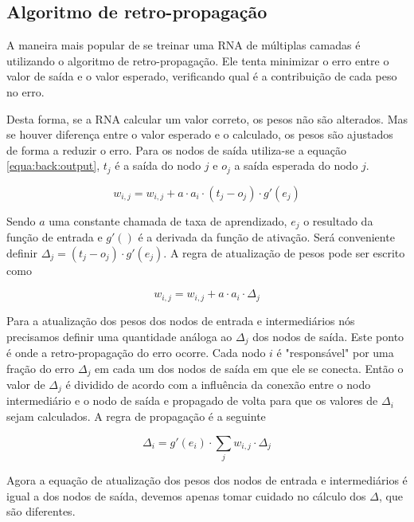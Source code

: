 \subsection{Algoritmo de retro-propagação}

A maneira mais popular de se treinar uma RNA de múltiplas camadas é utilizando o algoritmo de retro-propagação. Ele tenta minimizar o erro entre o valor de saída e o valor esperado, verificando qual é a contribuição de cada peso no erro.

Desta forma, se a RNA calcular um valor correto, os pesos não são alterados. Mas se houver diferença entre o valor esperado e o calculado, os pesos são ajustados de forma a reduzir o erro. Para os nodos de saída utiliza-se a equação \ref{equa:back:output}, $t_j$ é a saída do nodo $j$ e $o_j$ a saída esperada do nodo $j$.

\begin{equation}
	w_{i,j} = w_{i,j} + a \cdot a_i \cdot (t_j - o_j) \cdot g'(e_j)
	\label{equa:back:output}
\end{equation}

Sendo $a$ uma constante chamada de taxa de aprendizado, $e_j$ o resultado da função de entrada e $g'()$ é a derivada da função de ativação. Será conveniente definir $\Delta_j = (t_j - o_j) \cdot g'(e_j)$. A regra de atualização de pesos pode ser escrito como

\begin{equation}
	w_{i,j} = w_{i,j} + a \cdot a_i \cdot \Delta_j
\end{equation}

Para a atualização dos pesos dos nodos de entrada e intermediários nós precisamos definir uma quantidade análoga ao $\Delta_j$ dos nodos de saída. Este ponto é onde a retro-propagação do erro ocorre. Cada nodo $i$ é "responsável" por uma fração do erro $\Delta_j$ em cada um dos nodos de saída em que ele se conecta. Então o valor de $\Delta_j$ é dividido de acordo com a influência da conexão entre o nodo intermediário e o nodo de saída e propagado de volta para que os valores de $\Delta_i$ sejam calculados. A regra de propagação é a seguinte

\begin{equation}
	\Delta_i = g'(e_i) \cdot \sum_j w_{i,j} \cdot \Delta_j
\end{equation}

Agora a equação de atualização dos pesos dos nodos de entrada e intermediários é igual a dos nodos de saída, devemos apenas tomar cuidado no cálculo dos $\Delta$, que são diferentes.

